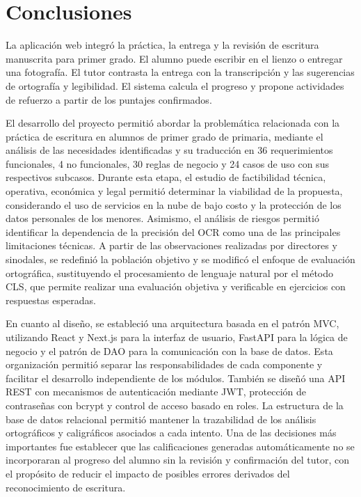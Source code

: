 \clearpage
{}
{}
\section*{Conclusiones}

La aplicación web integró la práctica, la entrega y la revisión de escritura manuscrita para primer grado. El alumno puede escribir en el lienzo o entregar una fotografía. El tutor contrasta la entrega con la transcripción y las sugerencias de ortografía y legibilidad. El sistema calcula el progreso y propone actividades de refuerzo a partir de los puntajes confirmados.

El desarrollo del proyecto permitió abordar la problemática relacionada con la práctica de escritura en alumnos de primer grado de primaria, mediante el análisis de las necesidades identificadas y su traducción en 36 requerimientos funcionales, 4 no funcionales, 30 reglas de negocio y 24 casos de uso con sus respectivos subcasos. Durante esta etapa, el estudio de factibilidad técnica, operativa, económica y legal permitió determinar la viabilidad de la propuesta, considerando el uso de servicios en la nube de bajo costo y la protección de los datos personales de los menores. Asimismo, el análisis de riesgos permitió identificar la dependencia de la precisión del OCR como una de las principales limitaciones técnicas. A partir de las observaciones realizadas por directores y sinodales, se redefinió la población objetivo y se modificó el enfoque de evaluación ortográfica, sustituyendo el procesamiento de lenguaje natural por el método CLS, que permite realizar una evaluación objetiva y verificable en ejercicios con respuestas esperadas.

En cuanto al diseño, se estableció una arquitectura basada en el patrón MVC, utilizando React y Next.js para la interfaz de usuario, FastAPI para la lógica de negocio y el patrón de DAO para la comunicación con la base de datos. Esta organización permitió separar las responsabilidades de cada componente y facilitar el desarrollo independiente de los módulos. También se diseñó una API REST con mecanismos de autenticación mediante JWT, protección de contraseñas con bcrypt y control de acceso basado en roles. La estructura de la base de datos relacional permitió mantener la trazabilidad de los análisis ortográficos y caligráficos asociados a cada intento. Una de las decisiones más importantes fue establecer que las calificaciones generadas automáticamente no se incorporaran al progreso del alumno sin la revisión y confirmación del tutor, con el propósito de reducir el impacto de posibles errores derivados del reconocimiento de escritura.

